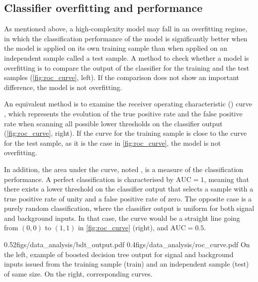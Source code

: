\subsection{Classifier overfitting and performance} \label{sec:da_cls_performance}
As mentioned above, a high-complexity model may fall in an overfitting regime, in which the classification performance of the model is significantly better when the model is applied on its own training sample than when applied on an independent sample called a test sample.
A method to check whether a model is overfitting is to compare the output of the classifier for the training and the test samples (\cref{fig:roc_curve}, left).
If the comparison does not show an important difference, the model is not overfitting.

An equivalent method is to examine the receiver operating characteristic (\ROC) curve \cite{peterson1954theory}, which represents the evolution of the true positive rate and the false positive rate when scanning all possible lower thresholds on the classifier output (\cref{fig:roc_curve}, right).
If the \ROC curve for the training sample is close to the \ROC curve for the test sample, as it is the case in \cref{fig:roc_curve}, the model is not overfitting.

In addition, the area under the \ROC curve, noted \AUC, is a measure of the classification performance.
A perfect classification is characterised by $\mathrm{AUC}=1$, meaning that there exists a lower threshold on the classifier output that selects a sample with a true positive rate of unity and a false positive rate of zero.
The opposite case is a purely random classification, where the classifier output is uniform for both signal and background inputs.
In that case, the \ROC curve would be a straight line going from $(0,0)$ to $(1,1)$ in \cref{fig:roc_curve} (right), and $\mathrm{AUC}=0.5$.

{0.52}{figs/data_analysis/bdt_output.pdf}
{0.4}{figs/data_analysis/roc_curve.pdf}
{On the left, example of boosted decision tree output for signal and background inputs issued from the training sample (train) and an independent sample (test) of same size.
On the right, corresponding \ROC curves.}
